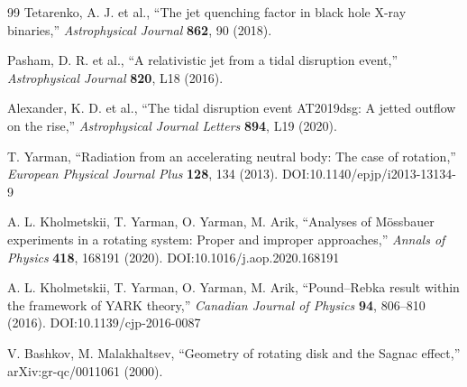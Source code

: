 \documentclass[12pt,a4paper]{article}
\begin{document}
\begin{thebibliography}{99}
		Tetarenko, A. J. et al., ``The jet quenching factor in black hole X-ray binaries,'' \emph{Astrophysical Journal} \textbf{862}, 90 (2018).
		
		Pasham, D. R. et al., ``A relativistic jet from a tidal disruption event,'' \emph{Astrophysical Journal} \textbf{820}, L18 (2016).
		
		Alexander, K. D. et al., ``The tidal disruption event AT2019dsg: A jetted outflow on the rise,'' \emph{Astrophysical Journal Letters} \textbf{894}, L19 (2020).
		
		T. Yarman, ``Radiation from an accelerating neutral body: The case of rotation,'' \emph{European Physical Journal Plus} \textbf{128}, 134 (2013). DOI:10.1140/epjp/i2013-13134-9
		
		A. L. Kholmetskii, T. Yarman, O. Yarman, M. Arik, ``Analyses of Mössbauer experiments in a rotating system: Proper and improper approaches,'' \emph{Annals of Physics} \textbf{418}, 168191 (2020). DOI:10.1016/j.aop.2020.168191
		
		A. L. Kholmetskii, T. Yarman, O. Yarman, M. Arik, ``Pound–Rebka result within the framework of YARK theory,'' \emph{Canadian Journal of Physics} \textbf{94}, 806–810 (2016). DOI:10.1139/cjp-2016-0087
		
		V. Bashkov, M. Malakhaltsev, ``Geometry of rotating disk and the Sagnac effect,'' arXiv:gr-qc/0011061 (2000).
		
	\end{thebibliography}
	
\end{document}
